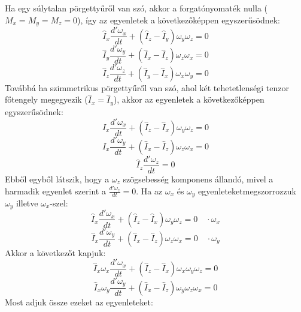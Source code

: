 \documentclass[a4paper,12pt]{article}
\begin{document}
Ha egy súlytalan pörgettyűről van szó, akkor a forgatónyomaték nulla ($M_x = M_y = M_z = 0$), így az egyenletek a következőképpen egyszerűsödnek:
\begin{equation}
    \hat{I}_x \frac{d'\omega_x}{dt} + (\hat{I}_z - \hat{I}_y) \omega_y \omega_z = 0
\end{equation}
\begin{equation}
    \hat{I}_y \frac{d'\omega_y}{dt} + (\hat{I}_x - \hat{I}_z) \omega_z \omega_x = 0
\end{equation}
\begin{equation}
    \hat{I}_z \frac{d'\omega_z}{dt} + (\hat{I}_y - \hat{I}_x) \omega_x \omega_y = 0
\end{equation}
Továbbá ha szimmetrikus pörgettyűről van szó, ahol két tehetetlenségi tenzor főtengely megegyezik ($\hat{I}_x = \hat{I}_y$), akkor az egyenletek a következőképpen egyszerűsödnek:
\begin{equation}
    \hat{I}_x \frac{d'\omega_x}{dt} + (\hat{I}_z - \hat{I}_x) \omega_y \omega_z = 0
\end{equation}
\begin{equation}
    \hat{I}_x \frac{d'\omega_y}{dt} + (\hat{I}_x - \hat{I}_z) \omega_z \omega_x = 0
\end{equation}
\begin{equation}
    \hat{I}_z \frac{d'\omega_z}{dt} = 0
\end{equation}
Ebből egyből látszik, hogy a $\omega_z$ szögsebesség komponens állandó, mivel a harmadik egyenlet szerint a $\frac{d'\omega_z}{dt} = 0$. 
Ha az $\omega_x$ és $\omega_y$ egyenleteketmegszorrozzuk $\omega_y$ illetve $\omega_x$-szel:
\begin{equation}
    \hat{I}_x \frac{d'\omega_x}{dt} + (\hat{I}_z - \hat{I}_x) \omega_y \omega_z = 0 \quad \cdot \omega_x
\end{equation}
\begin{equation}
    \hat{I}_x \frac{d'\omega_y}{dt} + (\hat{I}_x - \hat{I}_z) \omega_z \omega_x = 0 \quad \cdot \omega_y
\end{equation}
Akkor a következőt kapjuk:
\begin{equation}
    \hat{I}_x \omega_x \frac{d'\omega_x}{dt} + (\hat{I}_z - \hat{I}_x) \omega_x \omega_y \omega_z = 0
\end{equation}
\begin{equation}
    \hat{I}_x \omega_y \frac{d'\omega_y}{dt} + (\hat{I}_x - \hat{I}_z) \omega_y \omega_z \omega_x = 0
\end{equation}
Most adjuk össze ezeket az egyenleteket:
\end{document}

